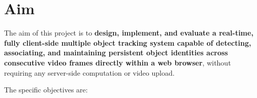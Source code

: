 \chapter{Aim}
\label{ch:aim}

The aim of this project is to \textbf{design, implement, and evaluate a real-time, fully client-side multiple object tracking system capable of detecting, associating, and maintaining persistent object identities across consecutive video frames directly within a web browser}, without requiring any server-side computation or video upload.

\vspace{0.5cm}

\noindent The specific objectives are:

